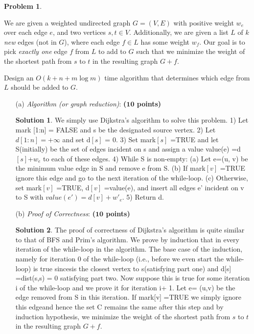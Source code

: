 \documentclass{article}
\theoremstyle{definition}
\newtheorem{problem}{Problem}
\newtheorem*{solution*}{Solution}
\newenvironment{solution}{\begin{solution*}}{{} \end{solution*}}
\newcommand{\grade}[1]{\hfill{\textbf{($\mathbf{#1}$ points)}}}
\begin{document}
\begin{problem}\label{sp}

We are given a weighted undirected graph $G=(V,E)$ with positive weight $w_e$ over each edge $e$, and two vertices $s,t \in V$. Additionally, we are given a list $L$ of $k$ \emph{new} edges (not in $G$), where each edge $f \in L$ has some weight $w_f$. 
Our goal is to pick \emph{exactly one} edge $f$ from $L$ to add to $G$ such that we minimize the weight of the shortest path from $s$ to $t$ in the resulting graph $G+f$. 

Design an $O(k+n+m\log{m})$ time algorithm that determines which edge from $L$ should be added to $G$. 

\begin{enumerate}
	\item[(a)] \emph{Algorithm (or graph reduction)}: \grade{10} 
	
	
\begin{solution}

	We simply use Dijkstra’s algorithm to solve this problem. 1) Let mark [1:n] = FALSE and s be the designated source vertex. 2) Let $d [1:n] = +\infty$ and set d$[s]$ = 0. 3) Set mark$[s]$  =TRUE and let S(initially) be the set of edges incident on s and assign a value value(e) =d$[s]$+$w_e$ to each of these edges. 4) While S is non-empty: (a) Let e=(u, v) be the minimum value edge in S and remove e from S. (b) If mark$[v]$ =TRUE ignore this edge and go to the next iteration of the while-loop. (c) Otherwise, set mark$[v]$ =TRUE, d$[v]$ =value(e), and insert all edges e' incident on v to S with $value(e') =d[v] +w'_e$. 5) Return d. \\

\end{solution}

	\newpage
	\item[(b)] \emph{Proof of Correctness}: \grade{10} 


\begin{solution}

	The proof of correctness of Dijkstra’s algorithm is quite similar to that of BFS and Prim’s algorithm. We prove by induction that in every iteration of the while-loop in the algorithm. The base case of the induction, namely for iteration 0 of the while-loop (i.e., before we even start the while-loop) is true sincesis the closest vertex to s(satisfying part one) and d[s] =dist(s,s) = 0 satisfying part two. Now suppose this is true for some iteration i of the while-loop and we prove it for iteration i+ 1. Let e= (u,v) be the edge removed from S in this iteration. If mark[v] =TRUE we simply ignore this edgeand hence the set C remains the same after this step and by induction hypothesis, we minimize the weight of the shortest path from $s$ to $t$ in the resulting graph $G+f$. 


\end{solution}
\end{enumerate}
\end{problem}
\end{document}
